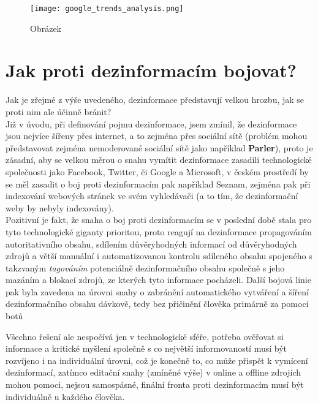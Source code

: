 \begin{figure}[htbp]
  \centering
  \texttt{[image: google\_trends\_analysis.png]}
  \caption{Obrázek}
  \label{fig:google trends}
\end{figure}

\newpage

\section{Jak proti dezinformacím bojovat?}

Jak je zřejmé z výše uvedeného, dezinformace představují velkou hrozbu, jak se proti nim ale účinně bránit?\\

Již v úvodu, při definování pojmu dezinformace, jsem zmínil, že dezinformace jsou nejvíce šířeny přes internet, a to zejména přes sociální sítě (problém mohou představovat zejména nemoderované sociální sítě jako například \textbf{Parler}), proto je zásadní, aby se velkou měrou o snahu vymítit dezinformace zasadili technologické společnosti jako Facebook, Twitter, či Google a Microsoft, v českém prostředí by se měl zasadit o boj proti dezinformacím pak například Seznam, zejména pak při indexování webových stránek ve svém vyhledávači (a to tím, že dezinformační weby by nebyly indexovány).\\

Pozitivní je fakt, že snaha o boj proti dezinformacím se v poslední době stala pro tyto technologické giganty prioritou, proto reagují na dezinformace propagováním autoritativního obsahu, sdílením důvěryhodných informací od důvěryhodných zdrojů a větší manuální i automatizovanou kontrolu sdíleného obsahu spojeného s takzvaným \textit{tagováním} potenciálně dezinformačního obsahu společně s jeho mazáním a blokací zdrojů, ze kterých tyto informace pocházeli. Další bojová linie pak byla zavedena na úrovni snahy o zabránění automatického vytváření a šíření dezinformačního obsahu dávkově, tedy bez přičinění člověka primárně za pomoci botů

Všechno řešení ale nespočívá jen v technologické sféře, potřeba ověřovat si informace a kritické myšlení společně s co největší informovaností musí být rozvíjeno i na individuální úrovni, což je konečně to, co může přispět k vymícení dezinformací, zatímco editační snahy (zmíněné výše) v online a offline zdrojích mohou pomoci, nejsou samospásné, finální fronta proti dezinformacím musí být individuálně u každého člověka.\\

